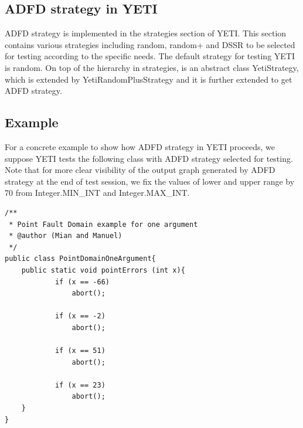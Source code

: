  \subsection{ADFD strategy in YETI}
ADFD strategy is implemented in the strategies section of YETI. This section contains various strategies including random, random+ and DSSR to be selected for testing according to the specific needs. The default strategy for testing YETI is random. On top of the hierarchy in strategies, is an abstract class YetiStrategy, which is extended by YetiRandomPlusStrategy and it is further extended to get ADFD strategy.
 

\subsection{Example}\label{sec:example}
For a concrete example to show how ADFD strategy in YETI proceeds, we suppose YETI tests the following class with ADFD strategy selected for testing. Note that for more clear visibility of the output graph generated by ADFD strategy at the end of test session, we fix the values of lower and upper range by 70 from Integer.MIN\_INT and Integer.MAX\_INT. 

\begin{lstlisting}
/**
 * Point Fault Domain example for one argument
 * @author (Mian and Manuel)
 */
public class PointDomainOneArgument{
	public static void pointErrors (int x){
     		if (x == -66)
       			abort();
     
     		if (x == -2)
     			abort();
      				
     		if (x == 51)
     			abort();
     
     		if (x == 23)
     			abort();
	}
}
\end{lstlisting}


